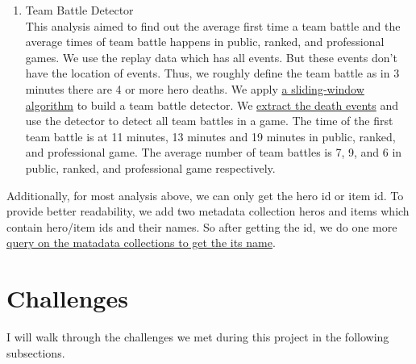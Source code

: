 \documentclass{article}
\begin{document}
\begin{enumerate}
    \item Team Battle Detector\\
    This analysis aimed to find out the average first time a team battle and the average times of team battle happens in public, ranked, and professional games. We use the replay data which has all events. But these events don't have the location of events. Thus, we roughly define the team battle as in 3 minutes there are 4 or more hero deaths. We apply \href{https://github.com/Vopaaz/big-data-psg-lgd/blob/master/src/main/scala/TeamBattleDetector.scala#L61-L78}{a sliding-window algorithm} to build a team battle detector. We \href{https://github.com/Vopaaz/big-data-psg-lgd/blob/master/src/main/scala/TeamBattleDetector.scala#L33-L36}{extract the death events} and use the detector to detect all team battles in a game. The time of the first team battle is at 11 minutes, 13 minutes and 19 minutes in public, ranked, and professional game. The average number of team battles is 7, 9, and 6 in public, ranked, and professional game respectively.
\end{enumerate}
Additionally, for most analysis above, we can only get the hero id or item id. To provide better readability, we add two metadata collection heros and items which contain hero/item ids and their names. So after getting the id, we do one more \href{https://github.com/Vopaaz/big-data-psg-lgd/blob/master/src/main/scala/Spark/SparkMongoHelper.scala#L15-L29}{query on the matadata collections to get the its name}.
\section{Challenges}
I will walk through the challenges we met during this project in the following subsections.
\end{document}
